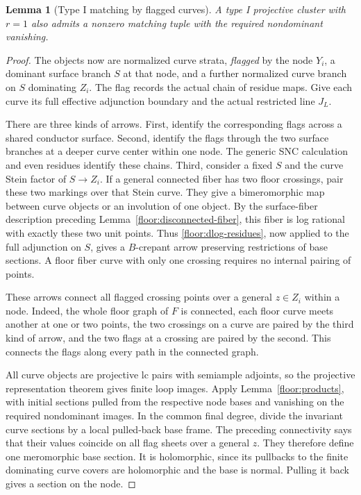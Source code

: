 \documentclass[11pt,letterpaper]{article}
\newtheorem{lemma}[theorem]{Lemma}
\theoremstyle{definition}
\theoremstyle{remark}
\begin{document}
\begin{lemma}[Type I matching by flagged curves]
\label{floor:projective-r1-I}
A type I projective cluster with $r=1$
also admits a nonzero matching tuple with
the required nondominant vanishing.
\end{lemma}

\begin{proof}
The objects now are normalized curve
strata, \emph{flagged} by the node $Y_i$,
a dominant surface branch $S$ at that
node, and a further normalized curve
branch on $S$ dominating $Z_i$.  The
flag records the actual chain of residue
maps.  Give each curve its full effective
adjunction boundary and the actual
restricted line $J_L$.

There are three kinds of arrows.
First, identify the corresponding
flags across a shared conductor surface.
Second, identify the flags through the
two surface branches at a deeper curve
center within one node.  The generic SNC
calculation and even residues identify
these chains.  Third, consider a fixed
$S$ and the curve Stein factor of
$S\to Z_i$.  If a general connected
fiber has two floor crossings, pair
these two markings over that Stein
curve.  They give a bimeromorphic map
between curve objects or an involution
of one object.  By the surface-fiber
description preceding
Lemma~\ref{floor:disconnected-fiber},
this fiber is log rational with exactly
these two unit points.  Thus
\eqref{floor:dlog-residues}, now applied
to the full adjunction on $S$, gives a
$B$-crepant arrow preserving restrictions
of base sections.  A floor fiber curve
with only one crossing requires no
internal pairing of points.

These arrows connect all flagged
crossing points over a general
$z\in Z_i$ within a node.  Indeed, the
whole floor graph of $F$ is connected,
each floor curve meets another at one
or two points, the two crossings on a
curve are paired by the third kind of
arrow, and the two flags at a crossing
are paired by the second.  This connects
the flags along every path in the
connected graph.

All curve objects are projective lc
pairs with semiample adjoints, so the
projective representation theorem gives
finite loop images.  Apply
Lemma~\ref{floor:products}, with initial
sections pulled from the respective
node bases and vanishing on the required
nondominant images.  In the common final
degree, divide the invariant curve
sections by a local pulled-back base
frame.  The preceding connectivity says
that their values coincide on all flag
sheets over a general $z$.  They
therefore define one meromorphic base
section.  It is holomorphic, since its
pullbacks to the finite dominating
curve covers are holomorphic and the
base is normal.  Pulling it back gives
a section on the node.


\end{proof}
\end{document}
